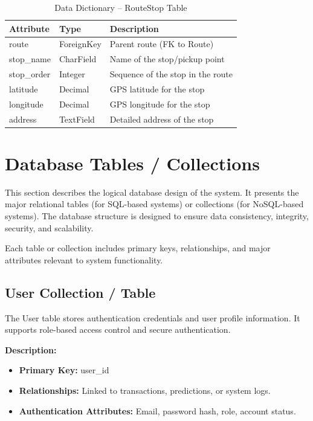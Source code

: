 \begin{table}[H]
\centering
\caption{Data Dictionary – RouteStop Table}
\renewcommand{\arraystretch}{1.5}
\begin{tabular}{|p{3cm}|p{3cm}|p{7cm}|}
\hline
\textbf{Attribute} & \textbf{Type} & \textbf{Description} \\
\hline
route & ForeignKey & Parent route (FK to Route) \\
\hline
stop\_name & CharField & Name of the stop/pickup point \\
\hline
stop\_order & Integer & Sequence of the stop in the route \\
\hline
latitude & Decimal & GPS latitude for the stop \\
\hline
longitude & Decimal & GPS longitude for the stop \\
\hline
address & TextField & Detailed address of the stop \\
\hline
\end{tabular}
\end{table}

\section{Database Tables / Collections}

This section describes the logical database design of the system. It presents the major relational tables (for SQL-based systems) or collections (for NoSQL-based systems). The database structure is designed to ensure data consistency, integrity, security, and scalability.

Each table or collection includes primary keys, relationships, and major attributes relevant to system functionality.

\subsection{User Collection / Table}

The User table stores authentication credentials and user profile information. It supports role-based access control and secure authentication.

\textbf{Description:}
\begin{itemize}
    \item \textbf{Primary Key:} user\_id
    \item \textbf{Relationships:} Linked to transactions, predictions, or system logs.
    \item \textbf{Authentication Attributes:} Email, password hash, role, account status.
\end{itemize}

